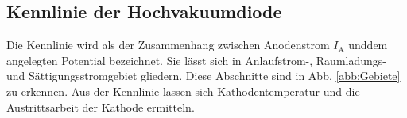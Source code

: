 \subsection{Kennlinie der Hochvakuumdiode}

Die Kennlinie wird als der Zusammenhang zwischen Anodenstrom 
$I_\text{A}$ unddem angelegten Potential bezeichnet. 
Sie lässt sich in Anlaufstrom-, Raumladungs- und 
Sättigungsstromgebiet gliedern. 
Diese Abschnitte sind in Abb. \ref{abb:Gebiete} zu erkennen. 
Aus der Kennlinie lassen sich Kathodentemperatur und die 
Austrittsarbeit der Kathode ermitteln. 

